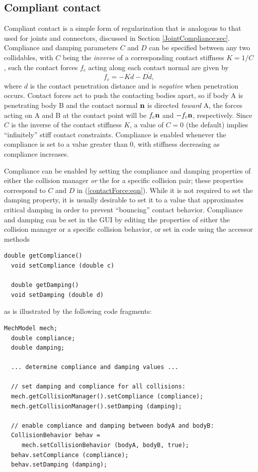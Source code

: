 \subsection{Compliant contact}
\label{CompliantContact:sec}

Compliant contact is a simple form of regularization that is analogous
to that used for joints and connectors, discussed in Section
\ref{JointCompliance:sec}.  Compliance and damping parameters $C$ and
$D$ can be specified between any two collidables, with $C$ being the
{\it inverse} of a corresponding contact stiffness $K = 1/C$, such the
contact forces $f_c$ acting along each contact normal are given by
%
\begin{equation}
f_c = - K d - D \dot d,
\label{contactForce:eqn}
\end{equation}
%
where $d$ is the contact penetration distance and is {\it negative}
when penetration occurs. Contact forces act to push the contacting
bodies apart, so if body A is penetrating body B and the contact
normal ${\bf n}$ is directed {\it toward} A, the forces acting on A and B
at the contact point will be $f_c {\bf n}$ and $-f_c {\bf n}$, respectively.
Since $C$ is the inverse of the contact stiffness $K$, a value of $C =
0$ (the default) implies ``infinitely'' stiff contact
constraints. Compliance is enabled whenever the compliance is set
to a value greater than 0, with stiffness decreasing as compliance
increases.

Compliance can be enabled by setting the {\sf compliance} and {\sf
damping} properties of either the collision manager {\it or} the
 for a
specific collision pair; these properties correspond to $C$ and $D$ in
(\ref{contactForce:eqn}). While it is not required to set the damping
property, it is usually desirable to set it to a value that
approximates critical damping in order to prevent ``bouncing'' contact
behavior. Compliance and damping can be set in the GUI by editing the
properties of either the collision manager or a specific collision
behavior, or set in code using the accessor methods
%
\begin{lstlisting}[]
  double getCompliance()
  void setCompliance (double c)

  double getDamping()
  void setDamping (double d)
\end{lstlisting}
%
as is illustrated by the following code fragments:
%
\begin{lstlisting}[]
  MechModel mech;
  double compliance;
  double damping;

  ... determine compliance and damping values ...

  // set damping and compliance for all collisions:
  mech.getCollisionManager().setCompliance (compliance);
  mech.getCollisionManager().setDamping (damping);

  // enable compliance and damping between bodyA and bodyB:
  CollisionBehavior behav = 
     mech.setCollisionBehavior (bodyA, bodyB, true);
  behav.setCompliance (compliance);
  behav.setDamping (damping);
\end{lstlisting}
%


